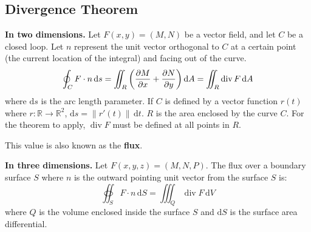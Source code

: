 \documentclass{article}
\DeclareMathOperator{\diverge}{div}
\begin{document}
\subsection{Divergence Theorem}

\textbf{In two dimensions.} Let $F(x,y)=(M,N)$ be a vector field, and let $C$ be a closed loop. Let $n$ represent the unit vector orthogonal to $C$ at a certain point (the current location of the integral) and facing out of the curve.
\begin{equation*}
    \oint_C F\cdot n \,\mathrm{d}s
	=\iint_R \left( \diffp Mx+\diffp Ny \right)\mathrm{d}A
	=\iint_R \diverge F \,\mathrm{d}A
\end{equation*}
where $\mathrm{d}s$ is the arc length parameter. If $C$ is defined by a vector function $r(t)$ where $r:\mathbb R\to\mathbb R^2$, $\mathrm{d}s=\lVert r'(t) \rVert \,\mathrm{d}t$. $R$ is the area enclosed by the curve $C$. For the theorem to apply, $\diverge F$ must be defined at all points in $R$.

This value is also known as the \textbf{flux}.

\textbf{In three dimensions.} Let $F(x,y,z)=(M,N,P)$. The flux over a boundary surface $S$ where $n$ is the outward pointing unit vector from the surface $S$ is:
\begin{equation*}
    \oiint_S F\cdot n \,\mathrm{d}S
	=\iiint_Q \diverge F \,\mathrm{d}V
\end{equation*}
where $Q$ is the volume enclosed inside the surface $S$ and $\mathrm{d}S$ is the surface area differential.
\end{document}
